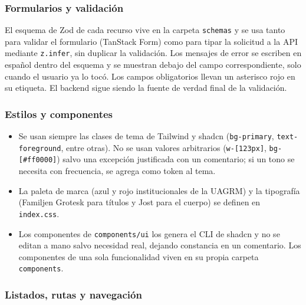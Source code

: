 \subsubsection{Formularios y validación}

El esquema de Zod de cada recurso vive en la carpeta \texttt{schemas} y se usa tanto para validar el formulario (TanStack Form) como para tipar la solicitud a la API mediante \texttt{z.infer}, sin duplicar la validación. Los mensajes de error se escriben en español dentro del esquema y se muestran debajo del campo correspondiente, solo cuando el usuario ya lo tocó. Los campos obligatorios llevan un asterisco rojo en su etiqueta. El backend sigue siendo la fuente de verdad final de la validación.

\subsubsection{Estilos y componentes}

\begin{itemize}
    \item Se usan siempre las clases de tema de Tailwind y shadcn (\texttt{bg-primary}, \texttt{text-foreground}, entre otras). No se usan valores arbitrarios (\texttt{w-[123px]}, \texttt{bg-[\#ff0000]}) salvo una excepción justificada con un comentario; si un tono se necesita con frecuencia, se agrega como token al tema.
    \item La paleta de marca (azul y rojo institucionales de la UAGRM) y la tipografía (Familjen Grotesk para títulos y Jost para el cuerpo) se definen en \texttt{index.css}.
    \item Los componentes de \texttt{components/ui} los genera el CLI de shadcn y no se editan a mano salvo necesidad real, dejando constancia en un comentario. Los componentes de una sola funcionalidad viven en su propia carpeta \texttt{components}.
\end{itemize}

\subsubsection{Listados, rutas y navegación}

